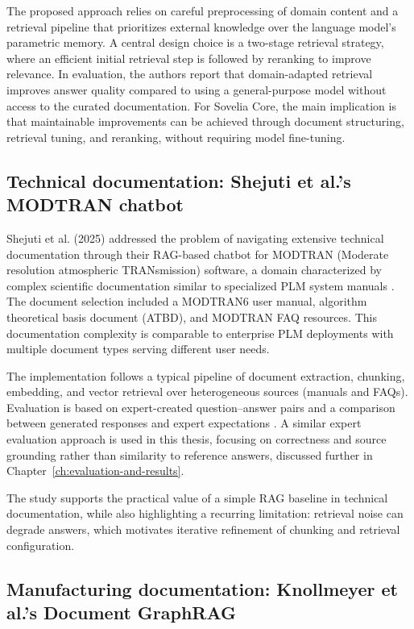 The proposed approach relies on careful preprocessing of domain content and a retrieval pipeline that prioritizes external knowledge over the language model's parametric memory. A central design choice is a two-stage retrieval strategy, where an efficient initial retrieval step is followed by reranking to improve relevance. In evaluation, the authors report that domain-adapted retrieval improves answer quality compared to using a general-purpose model without access to the curated documentation. For Sovelia Core, the main implication is that maintainable improvements can be achieved through document structuring, retrieval tuning, and reranking, without requiring model fine-tuning.

\subsection*{Technical documentation: Shejuti et al.'s MODTRAN chatbot}

Shejuti et al. (2025) addressed the problem of navigating extensive technical documentation through their RAG-based chatbot for MODTRAN (Moderate resolution atmospheric TRANsmission) software, a domain characterized by complex scientific documentation similar to specialized PLM system manuals \parencite{shejutiExtendedAbstractEnhancing2025}. The document selection included a MODTRAN6 user manual, algorithm theoretical basis document (ATBD), and MODTRAN FAQ resources. This documentation complexity is comparable to enterprise PLM deployments with multiple document types serving different user needs.

The implementation follows a typical pipeline of document extraction, chunking, embedding, and vector retrieval over heterogeneous sources (manuals and FAQs). Evaluation is based on expert-created question--answer pairs and a comparison between generated responses and expert expectations \parencite{shejutiExtendedAbstractEnhancing2025}. A similar expert evaluation approach is used in this thesis, focusing on correctness and source grounding rather than similarity to reference answers, discussed further in Chapter~\ref{ch:evaluation-and-results}.

The study supports the practical value of a simple RAG baseline in technical documentation, while also highlighting a recurring limitation: retrieval noise can degrade answers, which motivates iterative refinement of chunking and retrieval configuration.

\subsection*{Manufacturing documentation: Knollmeyer et al.'s Document GraphRAG}


